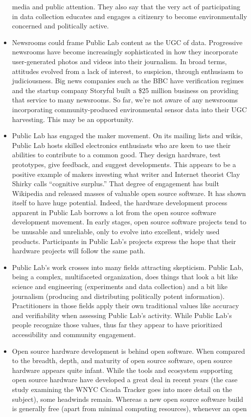 \begin{itemize}
media and public attention. They also say that the very act of participating
in data collection educates and engages a citizenry to become
environmentally concerned and politically active.
\item Newsrooms could frame Public Lab content as the UGC of data.
Progressive newsrooms have become increasingly sophisticated in
how they incorporate user-generated photos and videos into their
journalism. In broad terms, attitudes evolved from a lack of interest,
to suspicion, through enthusiasm to judiciousness. Big news companies
such as the BBC have verification regimes and the startup company
Storyful built a \$25 million business on providing that service to
many newsrooms. So far, we're not aware of any newsrooms incorporating
community-produced environmental sensor data into their
UGC harvesting. This may be an opportunity.
\item Public Lab has engaged the maker movement.
On its mailing lists and wikis, Public Lab hosts skilled electronics
enthusiasts who are keen to use their abilities to contribute to a common
good. They design hardware, test prototypes, give feedback, and
suggest developments. This appears to be a positive example of makers
investing what writer and Internet theorist Clay Shirky calls ``cognitive
surplus.'' That degree of engagement has built Wikipedia and
released masses of valuable open source software. It has shown itself
to have huge potential. Indeed, the hardware development process
apparent in Public Lab borrows a lot from the open source software
development movement. In early stages, open source software projects
tend to be unusable and unreliable, only to evolve into excellent,
widely used products. Participants in Public Lab's projects express the
hope that their hardware projects will follow the same path.
\item Public Lab's work crosses into many fields attracting skepticism.
Public Lab, being a complex, multifaceted organization, does things
that look a bit like science and engineering (experiments and data collection)
and a bit like journalism (producing and distributing politically
potent information). Practitioners in those fields apply their own
traditional values like accuracy and verifiability when assessing Public
Lab's activity. While Public Lab's people recognize those values,
thus far they appear to have prioritized accessibility and community
engagement.
\item Open source hardware development is behind open software.
When compared to the breadth, depth, and maturity of open source
software, open source hardware appears quite infant. While the tools
and ecosystem supporting open source hardware have developed
a great deal in recent years (the case study examining the WNYC
Cicada Tracker goes into more detail on the subject), some headwinds
remain. Whereas a new open source software build is generally
free (apart from minimal computing resources), whenever an open


\end{itemize}
